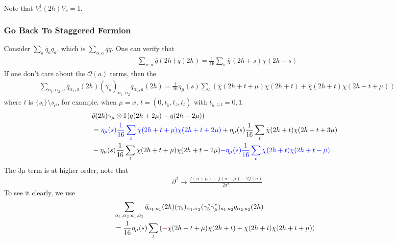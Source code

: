 Note that $V_s^{\dagger}(2h)V_s=1$.

\subsubsection{\label{QuarkGoBackToStaggered}Go Back To Staggered Fermion}

Consider $\sum _a \bar{q}_aq_a$, which is $\sum _{\alpha,a} \bar{q}q$. One can verify that
\begin{equation}
\begin{split}
&\sum _{\alpha,a} \bar{q}(2h)q(2h) = \frac{1}{16}\sum _s \bar{\chi}(2h+s)\chi (2h+s)
\end{split}
\end{equation}
If one don't care about the $\mathcal{O}(a)$ terms, then the
\textcolor[rgb]{0,0.5,0}{
\begin{equation}
\begin{split}
&\sum _{\alpha_1,\alpha _2,a} \bar{q}_{\alpha_1,a}(2h)(\gamma _{\mu})_{\alpha_1,\alpha_2} q_{\alpha _2,a}(2h) = \frac{1}{16} \eta _{\mu}(s)\sum _{t} \left(\bar{\chi}(2h+t+\mu)\chi (2h+t) +  \bar{\chi}(2h+t)\chi (2h+t+\mu)\right)
\end{split}
\end{equation}}
where $t$ is $\{s_{i}\}\setminus s_{\mu}$, for example, when $\mu=x$, $t=(0,t_y,t_z,t_t)$ with $t_{y,z,t}=0,1$.
\begin{equation}
\begin{split}
&\bar{q}(2h)\gamma _{\mu}\otimes \mathbb{I} \left(q(2h+2\mu)-q(2h-2\mu)\right) \\
&=\textcolor[rgb]{0,0,1}{\eta _{\mu}(s)\frac{1}{16}\sum _{t} \bar{\chi}(2h+t+\mu)\chi (2h+t+2\mu)} + \eta _{\mu}(s)\frac{1}{16}\sum _{t} \bar{\chi}(2h+t)\chi (2h+t+3\mu)\\
&-\eta _{\mu}(s)\frac{1}{16}\sum _{t} \bar{\chi}(2h+t+\mu)\chi (2h+t-2\mu) \textcolor[rgb]{0,0,1}{- \eta_{\mu} (s)\frac{1}{16}\sum _{t} \bar{\chi}(2h+t)\chi (2h+t-\mu)}
\end{split}
\end{equation}
The $3\mu$ term is at higher order, note that
\begin{equation}
\begin{split}
&\partial ^2 \to \frac{f(n+\mu)+f(n-\mu)-2f(n)}{2a^2}
\end{split}
\end{equation}
To see it clearly, we use
\begin{equation}
\begin{split}
&\sum _{\alpha_1,\alpha _2,a_1,a_2} \bar{q}_{\alpha_1,a_1}(2h)(\gamma _5)_{\alpha_1,\alpha_2} (\gamma _5^*\gamma _{\mu}^*)_{a_1,a_2}q_{\alpha _2,a_2}(2h) \\
&= \frac{1}{16} \eta _{\mu}(s)\sum _{t} \left(\textcolor[rgb]{1,0,0}{-}\bar{\chi}(2h+t+\mu)\chi (2h+t) +  \bar{\chi}(2h+t)\chi (2h+t+\mu)\right)
\end{split}
\label{eq.staggeredquark1}
\end{equation}
